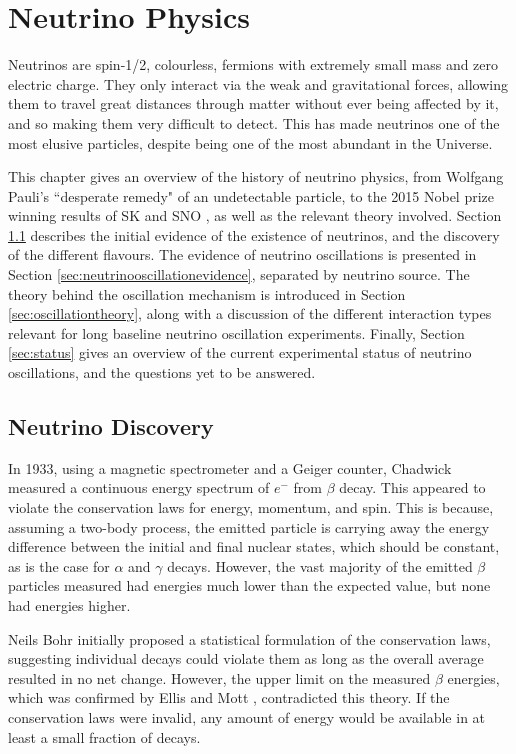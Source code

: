 \chapter{Neutrino Physics}\label{sec:NeutrinoPhysics}

Neutrinos are spin-1/2, colourless, fermions with extremely small mass and zero electric charge. They only interact via the weak and gravitational forces, allowing them to travel great distances through matter without ever being affected by it, and so making them very difficult to detect. This has made neutrinos one of the most elusive particles, despite being one of the most abundant in the Universe. 

This chapter gives an overview of the history of neutrino physics, from Wolfgang Pauli's ``desperate remedy" of an undetectable particle, to the 2015 Nobel prize winning results of SK \cite{FUKUDA2002179} and SNO \cite{Ahmad_2001}, as well as the relevant theory involved. Section \ref{sec:discovery} describes the initial evidence of the existence of neutrinos, and the discovery of the different flavours. The evidence of neutrino oscillations is presented in Section \ref{sec:neutrinooscillationevidence}, separated by neutrino source. The theory behind the oscillation mechanism is introduced in Section \ref{sec:oscillationtheory}, along with a discussion of the different interaction types relevant for long baseline neutrino oscillation experiments. Finally, Section \ref{sec:status} gives an overview of the current experimental status of neutrino oscillations, and the questions yet to be answered.

\section{Neutrino Discovery}\label{sec:discovery}

In 1933, using a magnetic spectrometer and a Geiger counter, Chadwick \cite{chadwick} measured a continuous energy spectrum of $e^-$ from $\beta$ decay. This appeared to violate the conservation laws for energy, momentum, and spin. This is because, assuming a two-body process, the emitted particle is carrying away the energy difference between the initial and final nuclear states, which should be constant, as is the case for $\alpha$ and $\gamma$ decays. However, the vast majority of the emitted $\beta$ particles measured had energies much lower than the expected value, but none had energies higher.

Neils Bohr initially proposed a statistical formulation of the conservation laws, suggesting individual decays could violate them as long as the overall average resulted in no net change. However, the upper limit on the measured $\beta$ energies, which was confirmed by Ellis and Mott \cite{bethe1934neutrino}, contradicted this theory. If the conservation laws were invalid, any amount of energy would be available in at least a small fraction of decays.

